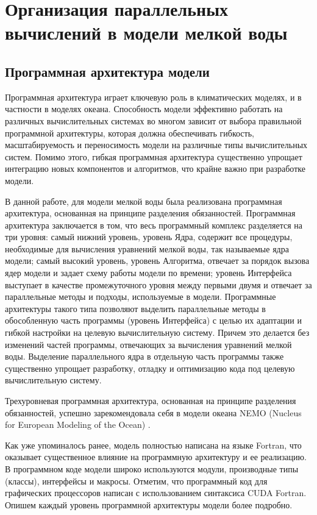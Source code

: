 \chapter{Организация параллельных вычислений в модели мелкой воды}\label{ch:ch2}

\section{Программная архитектура модели}\label{sec:ch2/sec1}

Программная архитектура играет ключевую роль в климатических моделях, и в частности в моделях океана.
Способность модели эффективно работать на различных вычислительных системах во многом зависит от выбора правильной программной архитектуры, которая должна обеспечивать гибкость, масштабируемость и переносимость модели на различные типы вычислительных систем.
Помимо этого, гибкая программная архитектура существенно упрощает интеграцию новых компонентов и алгоритмов, что крайне важно при разработке модели.

В данной работе, для модели мелкой воды была реализована программная архитектура, основанная на принципе разделения обязанностей.
Программная архитектура заключается в том, что весь программный комплекс разделяется на три уровня: самый нижний уровень, уровень Ядра, содержит все процедуры, необходимые для вычисления уравнений мелкой воды, так называемые ядра модели; самый высокий уровень, уровень Алгоритма, отвечает за порядок вызова ядер модели и задает схему работы модели по времени; уровень Интерфейса выступает в качестве промежуточного уровня между первыми двумя и отвечает за параллельные методы и подходы, используемые в модели. 
Программные архитектуры такого типа позволяют выделить параллельные методы в обособленную часть программы (уровень Интерфейса) с целью их адаптации и гибкой настройки на целевую вычислительную систему. Причем это делается без изменений частей программы, отвечающих за вычисления уравнений мелкой воды.
Выделение параллельного ядра в отдельную часть программы также существенно упрощает разработку, отладку и оптимизацию кода под целевую вычислительную систему.

Трехуровневая программная архитектура, основанная на принципе разделения обязанностей, успешно зарекомендовала себя в модели океана NEMO (Nucleus for European Modeling of the Ocean) \cite{gmd-11-3447-2018}. 

Как уже упоминалось ранее, модель полностью написана на языке Fortran, что оказывает существенное влияние на программную архитектуру и ее реализацию.
В программном коде модели широко используются модули, производные типы (классы), интерфейсы и макросы.
Отметим, что программный код для графических процессоров написан с использованием синтаксиса CUDA Fortran. 
Опишем каждый уровень программной архитектуры модели более подробно.

